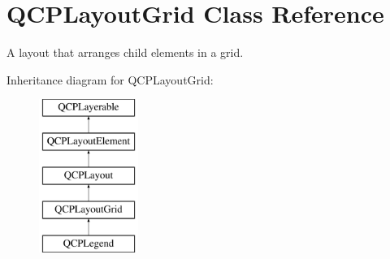 \hypertarget{classQCPLayoutGrid}{\section{\-Q\-C\-P\-Layout\-Grid \-Class \-Reference}
\label{classQCPLayoutGrid}
}


\-A layout that arranges child elements in a grid.  


\-Inheritance diagram for \-Q\-C\-P\-Layout\-Grid\-:\begin{figure}[H]
\begin{center}
\leavevmode
\includegraphics[height=5.000000cm]{classQCPLayoutGrid}
\end{center}
\end{figure}
